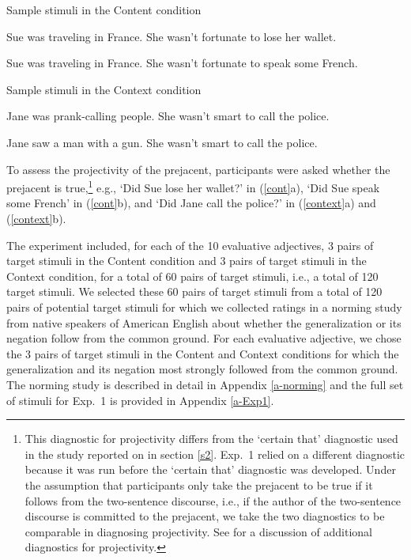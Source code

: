 \documentclass[11pt,fleqn]{article}
\newcommand{\6}{\mbox{$[\hspace*{-.6mm}[$}}
\newcommand{\9}{\mbox{$]\hspace*{-.6mm}]$}}
\begin{document}
\begin{exe}
\ex\label{cont} Sample stimuli in the Content condition 

\begin{xlist}
\ex Sue was traveling in France. She wasn't fortunate to lose her wallet.  

\ex Sue was traveling in France. She wasn't fortunate to speak some French.
\end{xlist}

\ex\label{context} Sample stimuli in the Context condition

\begin{xlist}
\ex Jane was prank-calling people. She wasn't smart to call the police. 

\ex Jane saw a man with a gun. She wasn't smart to call the police. 
\end{xlist}
\end{exe}
To assess the projectivity of the prejacent, participants were asked whether the prejacent is true,\footnote{This diagnostic for projectivity differs from the `certain that' diagnostic used in the study reported on in section \ref{s2}. Exp.~1 relied on a different diagnostic because it was run before the `certain that' diagnostic was developed. Under the assumption that participants only take the prejacent to be true if it follows from the two-sentence discourse, i.e., if the author of the two-sentence discourse is committed to the prejacent, we take the two diagnostics to be comparable in diagnosing projectivity. See \citealt{tbd-variability} for a discussion of additional diagnostics for projectivity.} e.g., `Did Sue lose her wallet?' in (\ref{cont}a), `Did Sue speak some French' in (\ref{cont}b), and `Did Jane call the police?' in (\ref{context}a) and (\ref{context}b).

The experiment included, for each of the 10 evaluative adjectives, 3 pairs of target stimuli in the Content condition and 3 pairs of target stimuli in the Context condition, for a total of 60 pairs of target stimuli, i.e., a total of 120 target stimuli. We selected these 60 pairs of target stimuli from a total of 120 pairs of potential target stimuli for which we collected ratings in a norming study from native speakers of American English about whether the generalization or its negation follow from the common ground. For each evaluative adjective, we chose the 3 pairs of target stimuli in the Content and Context conditions for which the generalization and its negation most strongly followed from the common ground. The norming study is described in detail in Appendix \ref{a-norming} and the full set of stimuli for Exp.~1 is provided in Appendix \ref{a-Exp1}.
\end{document}

